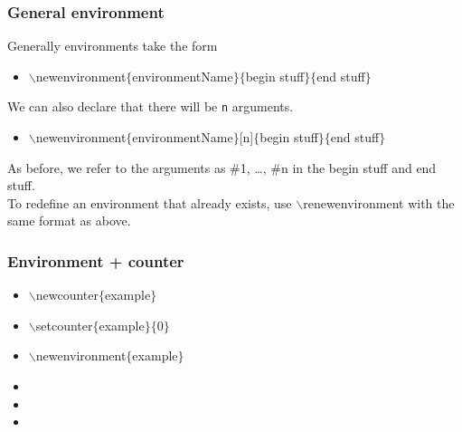 \begin{frame}  \frametitle{General environment}
Generally environments take the form
\vspace{0.5mm} \\
\begin{itemize}
\item[] {\color{command}$\backslash$newenvironment\color{braces}$\{${\color{black}environmentName}$\}\{${\color{highlight}begin stuff}$\}\{${\color{highlight}end stuff}$\}$}
\end{itemize}
\vspace{0.5mm}
We can also declare that there will be \texttt{n} arguments.
\vspace{0.5mm} \\
\begin{itemize}
\item[] {\color{command}$\backslash$newenvironment\color{braces}$\{${\color{black}environmentName}$\}${\color{black}[n]}$\{${\color{highlight}begin stuff}$\}\{${\color{highlight}end stuff}$\}$}
\end{itemize}
\vspace{0.5mm}
As before, we refer to the arguments as \#1, \dots, \#n in the {\color{highlight}begin stuff} and {\color{highlight}end stuff}.
\vspace{7mm} \\
To redefine an environment that already exists, use {\color{command}$\backslash$renewenvironment} with the same format as above.
\end{frame}

\begin{frame}  \frametitle{Environment + counter}
\begin{itemize}
\item[] {\color{command}$\backslash$newcounter\color{braces}$\{${\color{black}example}$\}$}
\item[] {\color{command}$\backslash$setcounter\color{braces}$\{${\color{black}example}$\}$$\{${\color{black}0}$\}$}
\item[] {\color{command}$\backslash$newenvironment\color{braces}$\{${\color{black}example}$\}$}
\item[] 
\item[] 
\item[] \hspace{4mm}{\color{braces}$\{${\color{command}$\backslash\backslash$}$\}$}
\end{itemize}
\end{frame}

